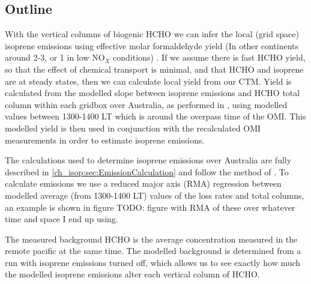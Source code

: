   \subsection{Outline}
   With the vertical columns of biogenic HCHO we can infer the local (grid space) isoprene emissions using effective molar formaldehyde yield (In other continents around 2-3, or 1 in low NO$_X$ conditions) \citep{Palmer2003,Marais2012,Bauwens2016}.
    If we assume there is fast HCHO yield, so that the effect of chemical transport is minimal, and that HCHO and isoprene are at steady states, then we can calculate local yield from our CTM.
   Yield is calculated from the modelled slope between isoprene emissions and HCHO total column within each gridbox over Australia, as performed in \cite{Palmer2003}, using modelled values between 1300-1400 LT which is around the overpass time of the OMI.
   This modelled yield is then used in conjunction with the recalculated OMI measurements in order to estimate isoprene emissions.
    
    The calculations used to determine isoprene emissions over Australia are fully described in \ref{ch_isop:sec:EmissionCalculation} and follow the method of \citet{Palmer2003}.
    To calculate emissions we use a reduced major axis (RMA) regression between modelled average (from 1300-1400 LT) values of the loss rates and total columns, an example is shown in figure TODO: figure with RMA of these over whatever time and space I end up using.
    
    The measured background HCHO is the average concentration measured in the remote pacific at the same time.
    The modelled background is determined from a run with isoprene emissions turned off, which allows us to see exactly how much the modelled isoprene emissions alter each vertical column of HCHO.
    
